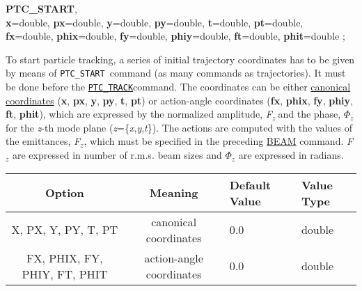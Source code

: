 \begin{description}
	\item[Commands]
	\item{\textbf{PTC\_START}, \textbf{
\\ x}=double, 
     \textbf{px}=double, \textbf{y}=double, \textbf{py}=double,
   \textbf{t}=double, \textbf{pt}=double,
\\ \textbf{fx}=double, 
     \textbf{phix}=double, \textbf{fy}=double,
   \textbf{phiy}=double, \textbf{ft}=double, \textbf{phit}=double 
   ;}

	\item[Description] To start particle tracking, a series of initial trajectory 
     coordinates has to be given by means of \texttt{PTC\_START 
       }command (as many commands as trajectories). It 
     must be done before the \texttt{\hyperlink{PTC_TRACK}{PTC\_TRACK}}command. The coordinates can be either
       \href{../Introduction/tables.html#canon}{canonical coordinates} (\textbf{x}, 
       \textbf{px}, \textbf{y}, \textbf{py},
     \textbf{t}, \textbf{pt}) or action-angle coordinates (\textbf{fx}, \textbf{phix}, 
       \textbf{fy}, \textbf{phiy}, \textbf{ft}, \textbf{phit}), which 
     are expressed by the normalized amplitude, \textit{F}$_\textit{z }$and the phase, 
       \textit{$\Phi$}$_\textit{z}$ 
     for the \textit{z}-th mode plane (\textit{z}=\{\textit{x},\textit{y},\textit{t}\}). 
     The actions are computed with the values of the emittances, \textit{F}$_\textit{z}$, 
     which must be specified in the preceding
       \href{../Introduction/beam.html}{BEAM} command. 
       \textit{F}$_\textit{z}$ are expressed in 
     number of r.m.s. beam sizes and
       \textit{$\Phi$}$_\textit{z}$ 
     are expressed in radians.
	\item[Options] 
	\text{ \\}	
	

\begin{tabular}{cc p{1.5cm} p{1.5cm}}
\hline 
\textbf{Option} & \textbf{Meaning} & \textbf{Default Value} & \textbf{Value Type} \\ 
\hline
X, PX, Y, PY, T, PT & canonical coordinates & 0.0 & double \\ 
\hline
FX, PHIX, FY, PHIY, FT, PHIT & action-angle coordinates & 0.0 & double \\ 
\hline
\end{tabular}


\end{description}
